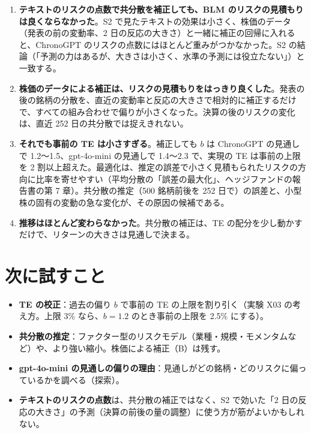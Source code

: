 \begin{enumerate}
\item \textbf{テキストのリスクの点数で共分散を補正しても、BLM のリスクの見積もりは良くならなかった}。S2 で見たテキストの効果は小さく、株価のデータ（発表の前の変動率、2 日の反応の大きさ）と一緒に補正の回帰に入れると、ChronoGPT のリスクの点数にはほとんど重みがつかなかった。S2 の結論（「予測の力はあるが、大きさは小さく、水準の予測には役立たない」）と一致する。
\item \textbf{株価のデータによる補正は、リスクの見積もりをはっきり良くした}。発表の後の銘柄の分散を、直近の変動率と反応の大きさで相対的に補正するだけで、すべての組み合わせで偏りが小さくなった。決算の後のリスクの変化は、直近 252 日の共分散では捉えきれない。
\item \textbf{それでも事前の TE は小さすぎる}。補正しても $b$ は ChronoGPT の見通しで 1.2〜1.5、gpt-4o-mini の見通しで 1.4〜2.3 で、実現の TE は事前の上限を 2 割以上超えた。最適化は、推定の誤差で小さく見積もられたリスクの方向に比率を寄せやすい（平均分散の「誤差の最大化」、ヘッジファンドの報告書の第 7 章）。共分散の推定（500 銘柄前後を 252 日で）の誤差と、小型株の固有の変動の急な変化が、その原因の候補である。
\item \textbf{推移はほとんど変わらなかった}。共分散の補正は、TE の配分を少し動かすだけで、リターンの大きさは見通しで決まる。
\end{enumerate}

\section{次に試すこと}

\begin{itemize}
\item \textbf{TE の校正}：過去の偏り $b$ で事前の TE の上限を割り引く（実験 X03 の考え方。上限 3\% なら、$b = 1.2$ のとき事前の上限を 2.5\% にする）。
\item \textbf{共分散の推定}：ファクター型のリスクモデル（業種・規模・モメンタムなど）や、より強い縮小。株価による補正（B）は残す。
\item \textbf{gpt-4o-mini の見通しの偏りの理由}：見通しがどの銘柄・どのリスクに偏っているかを調べる（探索）。
\item \textbf{テキストのリスクの点数}は、共分散の補正ではなく、S2 で効いた「2 日の反応の大きさ」の予測（決算の前後の量の調整）に使う方が筋がよいかもしれない。
\end{itemize}
